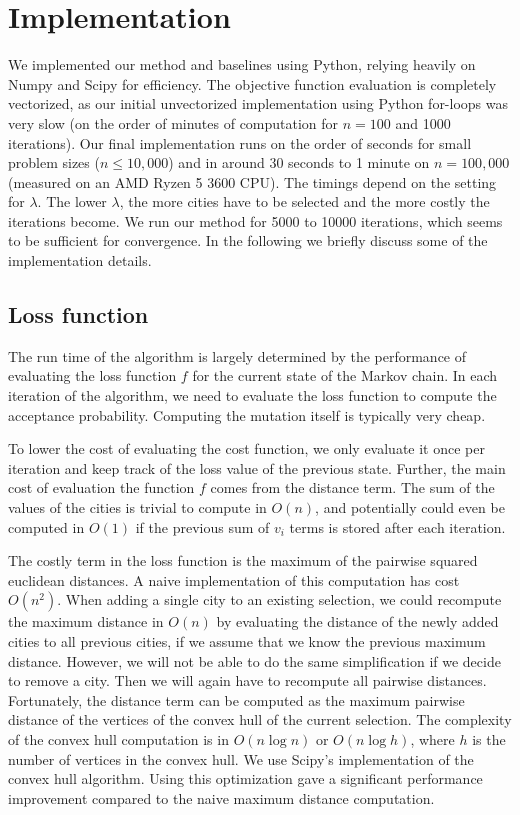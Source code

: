 \documentclass[conference,compsoc]{IEEEtran}
\begin{document}


\section{Implementation}
We implemented our method and baselines using Python, relying heavily on Numpy
\cite{harris2020array} and Scipy \cite{scipy} for efficiency. The objective
function evaluation is completely vectorized, as our initial unvectorized
implementation using Python for-loops was very slow (on the order of minutes of
computation for $n=100$ and 1000 iterations). Our final implementation runs on
the order of seconds for small problem sizes ($n \leq 10,000$) and in around 30
seconds to 1 minute on $n = 100,000$ (measured on an AMD Ryzen 5 3600 CPU). The
timings depend on the setting for $\lambda$. The lower $\lambda$, the more
cities have to be selected and the more costly the iterations become. We run our
method for 5000 to 10000 iterations, which seems to be sufficient for
convergence. In the following we briefly discuss some of the implementation
details.

\subsection{Loss function}
The run time of the algorithm is largely determined by the performance of
evaluating the loss function $f$ for the current state of the Markov chain. In
each iteration of the algorithm, we need to evaluate the loss function to
compute the acceptance probability. Computing the mutation itself is typically
very cheap.

To lower the cost of evaluating the cost function, we only evaluate it once per
iteration and keep track of the loss value of the previous state. Further, the
main cost of evaluation the function $f$ comes from the distance term. The sum
of the values of the cities is trivial to compute in $O(n)$, and potentially
could even be computed in $O(1)$ if the previous sum of $v_i$ terms is stored
after each iteration.

The costly term in the loss function is the maximum of the pairwise squared
euclidean distances. A naive implementation of this computation has cost
$O(n^2)$. When adding a single city to an existing selection, we could recompute
the maximum distance in $O(n)$ by evaluating the distance of the newly added
cities to all previous cities, if we assume that we know the previous maximum
distance. However, we will not be able to do the same simplification if we
decide to remove a city. Then we will again have to recompute all pairwise
distances. Fortunately, the distance term can be computed as the maximum
pairwise distance of the vertices of the convex hull of the current selection.
The complexity of the convex hull computation is in $O(n \log n)$ or $O(n \log
h)$, where $h$ is the number of vertices in the convex hull. We use Scipy's
implementation of the convex hull algorithm. Using this optimization gave a
significant performance improvement compared to the naive maximum distance
computation.
\end{document}
